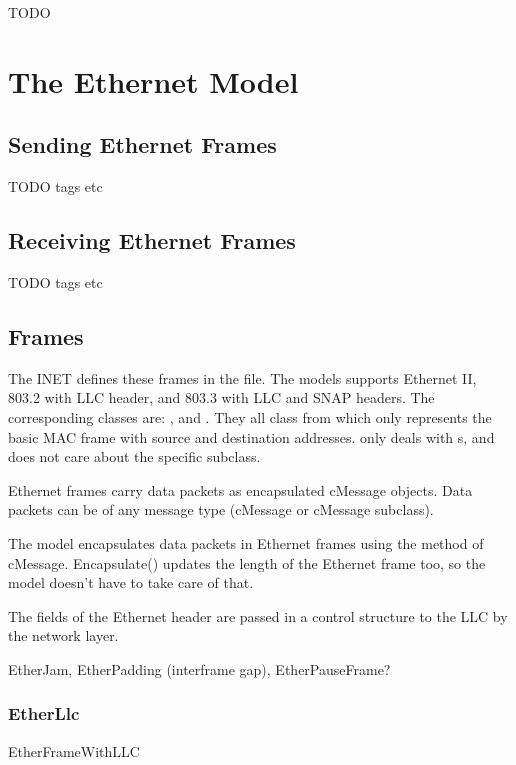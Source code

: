 \ifdraft TODO

\chapter{The Ethernet Model}
\label{cha:ethernet}

\section{Sending Ethernet Frames}

TODO tags etc

\section{Receiving Ethernet Frames}

TODO tags etc

\section{Frames}

The INET defines these frames in the  file.
The models supports Ethernet II, 803.2 with LLC header, and 803.3 with LLC and SNAP headers.
The corresponding classes are:
,  and . They all class
from  which only represents the basic MAC frame with source and
destination addresses.  only deals with s, and does not
care about the specific subclass.

Ethernet frames carry data packets as encapsulated cMessage objects.
Data packets can be of any message type (cMessage or cMessage subclass).

The model encapsulates data packets in Ethernet frames using the 
method of cMessage. Encapsulate() updates the length of the Ethernet frame too,
so the model doesn't have to take care of that.

The fields of the Ethernet header are passed in a 
control structure to the LLC by the network layer.


EtherJam, EtherPadding (interframe gap), EtherPauseFrame?


\subsection{EtherLlc}

EtherFrameWithLLC

